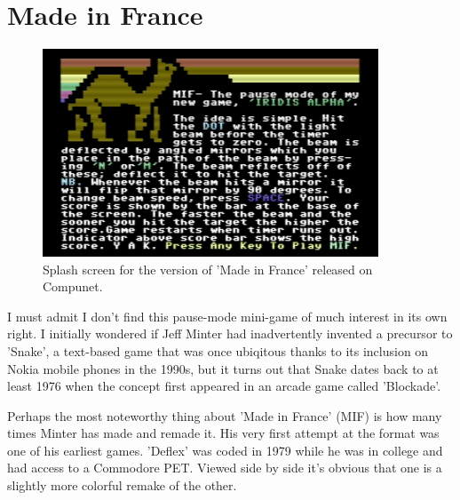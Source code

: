 \chapter{Made in France} 
\label{sec:mif}
\lstset{style=6502Style}
\begin{figure}[H]
    \centering
      \includegraphics[width=10cm]{src/mif/mif.png}%
\caption{Splash screen for the version of 'Made in France' released on Compunet.}
\end{figure}

I must admit I don't find this pause-mode mini-game of much interest in its own right. I initially
wondered if Jeff Minter had inadvertently invented a precursor to 'Snake', a text-based game that
was once ubiqitous thanks to its inclusion on Nokia mobile phones in the 1990s, but it turns out that
Snake dates back to at least 1976 when the concept first appeared in an arcade game called 'Blockade'.

Perhaps the most noteworthy thing about 'Made in France' (MIF) is how many times Minter has made and remade it. His very
first attempt at the format was one of his earliest games. 'Deflex' was coded in 1979 while he was in college and had access to a 
Commodore PET. Viewed side by side it's obvious that one is a slightly more colorful
remake of the other.

